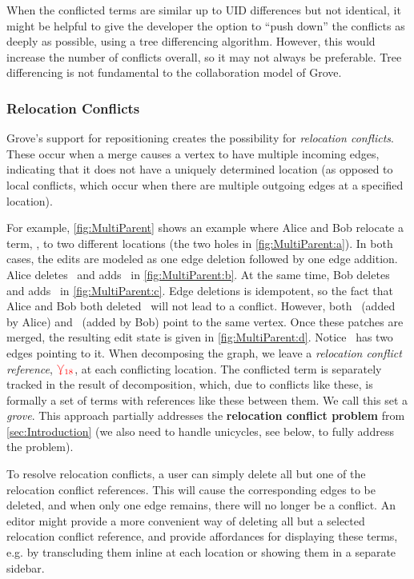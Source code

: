 When the conflicted terms are similar up to UID differences but not identical, it might be helpful  to give the developer the option to ``push down'' the conflicts as deeply as possible, using a tree differencing algorithm. However, this would increase the number of conflicts overall, so it may not always be preferable. Tree differencing is not fundamental to the collaboration model of Grove.


\subsubsection{Relocation Conflicts}%
\label{sub:Multi-parent conflicts}

\figureMultiParent

Grove's support for repositioning creates the possibility for \emph{relocation conflicts}. These occur when a merge causes a vertex to have multiple incoming edges, indicating that it does not have a uniquely determined location (as opposed to local conflicts, which occur when there are multiple outgoing edges at a specified location). 

For example, \autoref{fig:MultiParent} shows an example where Alice and Bob relocate a term, , to two different locations (the two holes in \autoref{fig:MultiParent:a}). In both cases, the edits are modeled as one edge deletion followed by one edge addition.
Alice deletes~\eNestedPartsAlice{} and adds~\eMultiParentAlice{} in \autoref{fig:MultiParent:b}.
At the same time, Bob deletes~\eNestedPartsAlice{} and adds~\eMultiParentBob{} in \autoref{fig:MultiParent:c}.
Edge deletions is idempotent,
so the fact that Alice and Bob both deleted~\eNestedPartsAlice{} will not lead to a conflict. 
However, both~\eMultiParentAlice{} (added by Alice) and~\eMultiParentBob{} (added by Bob)
point to the same vertex.
Once these patches are merged, the resulting edit state is given in \autoref{fig:MultiParent:d}.
Notice~\vNestedPartsAlice{} has two edges pointing to it. 
When decomposing the graph, we leave a \emph{relocation conflict reference}, $\textcolor{red}{\curlyveedownarrow_{18}}$, at each conflicting location. The conflicted term is separately tracked in the result of decomposition, which, due to conflicts like these, is formally a set of terms with references like these between them. We call this set a \emph{grove}. 
This approach partially addresses the \textbf{relocation conflict problem} from \autoref{sec:Introduction} (we also need to handle unicycles, see below, to fully address the problem).

To resolve relocation conflicts, a user can simply delete all but one of the relocation conflict references. This will cause the corresponding edges to be deleted,
and when only one edge remains, there will no longer be a conflict. An editor might provide a more convenient way of deleting all but a selected relocation conflict reference, and provide affordances for displaying these terms, e.g. by transcluding them inline at each location or showing them in a separate sidebar.

